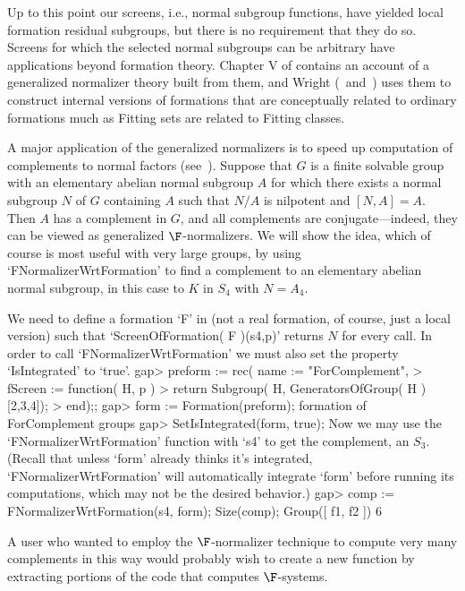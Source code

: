 


Up to this point our screens, i.e., normal subgroup functions, have yielded local formation residual subgroups, but there is no requirement that they do so. Screens for which the selected normal subgroups can be arbitrary have applications beyond formation theory. Chapter V of \cite{CH} contains an account of a generalized normalizer theory built from them, and Wright (\cite{WA}~and~\cite{WB}) uses them to construct internal versions of formations that are conceptually related to ordinary formations much as Fitting sets are related to Fitting classes.

A major application of the generalized normalizers is to speed up computation of complements to normal factors (see~\cite{EW}).
Suppose that $G$ is a finite solvable group with an elementary abelian
normal subgroup $A$ for which there exists a normal subgroup $N$ of $G$
containing $A$ such that $N/A$ is nilpotent and $[N,A] = A$. Then $A$ has a complement in $G$, and all complements
are conjugate---indeed, they can be viewed as generalized
$\F$-normalizers. We will show the idea, which of course is most useful with very large groups, by using `FNormalizerWrtFormation' to find a complement to an
elementary abelian normal subgroup, in this case to $K$ in $S_4$ with $N =
A_4$. 

We need to define a formation `F' in {\GAP} (not a real formation,
of course, just a local version) such that `ScreenOfFormation( F )(s4,p)' returns $N$ for
every call. In order to call `FNormalizerWrtFormation' we must also set the property
`IsIntegrated' to `true'.
\beginexample
gap> preform := rec( name := "ForComplement",
> fScreen := function( H, p )
> return Subgroup( H, GeneratorsOfGroup( H ){[2,3,4]});
> end);;
gap> form := Formation(preform);
formation of ForComplement groups 
gap> SetIsIntegrated(form, true);
\endexample
Now we may use the `FNormalizerWrtFormation' function with `s4' to
get the complement, an $S_3$. (Recall that unless `form' already
thinks it's integrated, `FNormalizerWrtFormation' will automatically
integrate `form' before running its computations, which may not be
the desired behavior.)
\beginexample
gap> comp := FNormalizerWrtFormation(s4, form); Size(comp);
Group([ f1, f2 ])
6
\endexample

A user who wanted to employ the $\F$-normalizer technique to compute very
many complements in this way would probably wish to create a new {\GAP}
function by extracting portions of the code that computes
$\F$-systems. 

